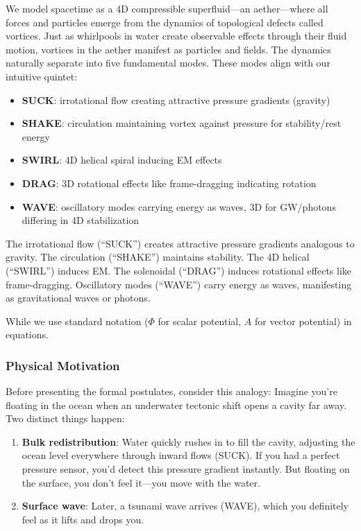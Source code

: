 We model spacetime as a 4D compressible superfluid---an aether---where all forces and particles emerge from the dynamics of topological defects called vortices. Just as whirlpools in water create observable effects through their fluid motion, vortices in the aether manifest as particles and fields. The dynamics naturally separate into five fundamental modes. These modes align with our intuitive quintet:
\begin{itemize}
\item \textbf{SUCK}: irrotational flow creating attractive pressure gradients (gravity)
\item \textbf{SHAKE}: circulation maintaining vortex against pressure for stability/rest energy
\item \textbf{SWIRL}: 4D helical spiral inducing EM effects
\item \textbf{DRAG}: 3D rotational effects like frame-dragging indicating rotation
\item \textbf{WAVE}: oscillatory modes carrying energy as waves, 3D for GW/photons differing in 4D stabilization
\end{itemize}
The irrotational flow (``SUCK'') creates attractive pressure gradients analogous to gravity. The circulation (``SHAKE'') maintains stability. The 4D helical (``SWIRL'') induces EM. The solenoidal (``DRAG'') induces rotational effects like frame-dragging. Oscillatory modes (``WAVE'') carry energy as waves, manifesting as gravitational waves or photons.

While we use standard notation ($\Phi$ for scalar potential, $A$ for vector potential) in equations.

\subsubsection{Physical Motivation}

Before presenting the formal postulates, consider this analogy: Imagine you're floating in the ocean when an underwater tectonic shift opens a cavity far away. Two distinct things happen:

\begin{enumerate}
\item \textbf{Bulk redistribution}: Water quickly rushes in to fill the cavity, adjusting the ocean level everywhere through inward flows (SUCK). If you had a perfect pressure sensor, you'd detect this pressure gradient instantly. But floating on the surface, you don't feel it---you move with the water.
\item \textbf{Surface wave}: Later, a tsunami wave arrives (WAVE), which you definitely feel as it lifts and drops you.
\end{enumerate}

